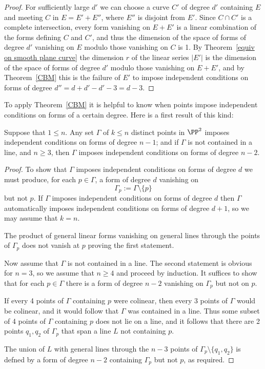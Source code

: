 \begin{proof}
For sufficiently large $d'$ we can choose a curve $C'$ of degree $d'$ containing
$E$ and meeting $C$ in $E = E'+E''$, where $E''$ is disjoint from $E'$. Since $C\cap C'$
is a complete intersection, every form vanishing on $E+E'$ is a linear combination of
the forms defining $C$ and $C'$, and thus the dimension of the space of forms of degree $d'$
vanishing on $E$ modulo those vanishing on $C$ is 1. By Theorem~\ref{equiv on smooth plane curve} the dimension $r$ of the linear series $|E'|$ is the dimension of the space of
forms of degree $d'$ modulo those vanishing on $E+E'$, and by Theorem~\ref{CBM} this
is the failure of $E'$ to impose independent conditions on forms of degree
$d'' = d+d' - d' -3 = d-3$.
\end{proof}

To apply Theorem~\ref{CBM} it is helpful to know when points impose independent conditions on forms of a certain degree. Here is a first result of this kind:

\begin{proposition}\label{n-2 independence}
Suppose that $1\leq n$. Any set $\Gamma$ of $k\leq n$ distinct points in $\PP^{2}$ imposes independent conditions on forms of degree $n-1$; and if $\Gamma$ is not contained in a line, and $n\geq 3$, then $\Gamma$ imposes independent conditions on forms of degree $n-2$.
\end{proposition}

\begin{proof} To show that $\Gamma$ imposes independent conditions on forms of degree $d$ we must produce, for each $p\in \Gamma$, a form of degree $d$ vanishing on 
$$
\Gamma_{p}:=\Gamma\setminus\{p\}
$$
 but not $p$. If $\Gamma$ imposes independent conditions on forms of degree $d$ then
 $\Gamma$ automatically imposes independent conditions on forms of degree $d+1$,
 so we may assume that $k=n$.
 
The product of general linear forms
 vanishing on general lines through the points of $\Gamma_{p}$ does not vanish at $p$ proving the first statement.

Now assume that $\Gamma$ is not contained in a line. The second statement is obvious for $n=3$, so we assume that $n\geq 4$ and proceed by induction. 
It suffices to show that for each $p\in \Gamma$ there is a form of degree $n-2$ vanishing on $\Gamma_{p}$ but not on $p$.

If every 4 points of $\Gamma$ containing $p$ were colinear, then every 3 points of $\Gamma$ would be colinear, and it would follow that $\Gamma$ was contained in a  line. Thus
some subset of 4 points of $\Gamma$ containing $p$ does not lie on a line, and it follows that
there are 2 points $q_{1},q_{2}$ of $\Gamma_{p}$ that span a line $L$ not containing $p$.

The union of $L$ with general lines through the $n-3$ points of $\Gamma_{p}\setminus\{q_{1},q_{2}\}$ is defned by a form of degree $n-2$ containing $\Gamma_{p}$ but not $p$, 
as required. 
\end{proof}

